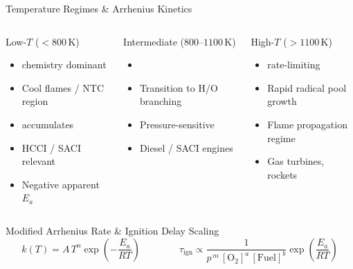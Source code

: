 \documentclass[aspectratio=169,10pt]{beamer}
\begin{document}
\begin{frame}{Temperature Regimes \& Arrhenius Kinetics}
  \begin{columns}[t]
    \begin{block}{\small Low-$T$ ($<800\,\mathrm{K}$)}
      \begin{itemize}\footnotesize
        \item {} chemistry dominant
        \item Cool flames / NTC region
        \item {} accumulates
        \item HCCI / SACI relevant
        \item Negative apparent $E_a$
      \end{itemize}
    \end{block}
    \begin{block}{\small Intermediate ($800$--$1100\,\mathrm{K}$)}
      \begin{itemize}\footnotesize
        \item {}
        \item Transition to H/O branching
        \item Pressure-sensitive
        \item Diesel / SACI engines
      \end{itemize}
    \end{block}
    \begin{block}{\small High-$T$ ($>1100\,\mathrm{K}$)}
      \begin{itemize}\footnotesize
        \item {} rate-limiting
        \item Rapid radical pool growth
        \item Flame propagation regime
        \item Gas turbines, rockets
      \end{itemize}
    \end{block}
  \end{columns}
  \vspace{0.25cm}
  \begin{alertblock}{Modified Arrhenius Rate \& Ignition Delay Scaling}
    \[
      k(T) = A\,T^n\exp\!\left(-\frac{E_a}{RT}\right)
      \qquad\qquad
      \tau_{\mathrm{ign}} \propto
      \frac{1}{p^{\,m}\,[\mathrm{O_2}]^{a}\,[\mathrm{Fuel}]^{b}}
      \exp\!\left(\frac{E_a}{RT}\right)
    \]
  \end{alertblock}
\end{frame}
\end{document}

